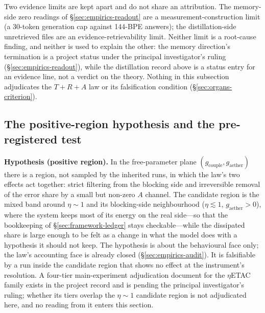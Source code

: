 \documentclass[11pt,a4paper]{article}
\newcommand{\gcouple}{g_{\mathrm{couple}}}
\newcommand{\gaether}{g_{\mathrm{aether}}}
\begin{document}
Two evidence limits are kept apart and do not share an attribution. The memory-side zero readings of \S\ref{sec:empirics-readout} are a measurement-construction limit (a 30-token generation cap against 144-BPE answers); the distillation-side unretrieved files are an evidence-retrievability limit. Neither limit is a root-cause finding, and neither is used to explain the other: the memory direction's termination is a project status under the principal investigator's ruling (\S\ref{sec:empirics-readout}), while the distillation record above is a status entry for an evidence line, not a verdict on the theory. Nothing in this subsection adjudicates the $T+R+A$ law or its falsification condition (\S\ref{sec:organs-criterion}).

\subsection{The positive-region hypothesis and the pre-registered test}
\label{sec:empirics-hypothesis}

\textbf{Hypothesis (positive region).} In the free-parameter plane $(\gcouple,\gaether)$ there is a region, not sampled by the inherited runs, in which the law's two effects act together: strict filtering from the blocking side and irreversible removal of the error share by a small but non-zero $A$ channel. The candidate region is the mixed band around $\eta \sim 1$ and its blocking-side neighbourhood ($\eta \lesssim 1$, $\gaether > 0$), where the system keeps most of its energy on the real side---so that the bookkeeping of \S\ref{sec:framework-ledger} stays checkable---while the dissipated share is large enough to be felt as a change in what the model does with a hypothesis it should not keep. The hypothesis is about the behavioural face only; the law's accounting face is already closed (\S\ref{sec:empirics-audit}). It is falsifiable by a run inside the candidate region that shows no effect at the instrument's resolution. A four-tier main-experiment adjudication document for the $\eta$ETAC family exists in the project record and is pending the principal investigator's ruling; whether its tiers overlap the $\eta \sim 1$ candidate region is not adjudicated here, and no reading from it enters this section.
\end{document}
